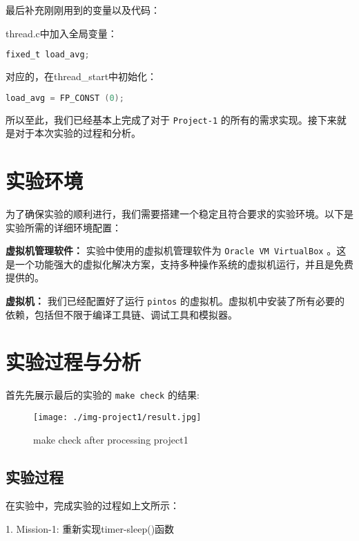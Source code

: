 \documentclass{article}
\begin{document}
	最后补充刚刚用到的变量以及代码：
	
	thread.c中加入全局变量：
	
	\begin{lstlisting}[language=C, title=thread.c加入新全局变量]
    fixed_t load_avg;
	\end{lstlisting}
	
	对应的，在thread\_start中初始化：
	
	\begin{lstlisting}[language=C, title=在thread\_start中初始化]
    load_avg = FP_CONST (0);
	\end{lstlisting}
	
	所以至此，我们已经基本上完成了对于 \texttt{Project-1} 的所有的需求实现。接下来就是对于本次实验的过程和分析。
	
	\section{实验环境}
	
	为了确保实验的顺利进行，我们需要搭建一个稳定且符合要求的实验环境。以下是实验所需的详细环境配置：
	
	\textbf{虚拟机管理软件：} 实验中使用的虚拟机管理软件为 \texttt{Oracle VM VirtualBox} 。这是一个功能强大的虚拟化解决方案，支持多种操作系统的虚拟机运行，并且是免费提供的。
	
	\textbf{虚拟机：} 我们已经配置好了运行 \texttt{pintos} 的虚拟机。虚拟机中安装了所有必要的依赖，包括但不限于编译工具链、调试工具和模拟器。
	
	\section{实验过程与分析}
	
	首先先展示最后的实验的 \texttt{make check} 的结果:
	
	\begin{figure}[htbp]
		\centering
		\texttt{[image: ./img-project1/result.jpg]}
		\caption{make check after processing project1}
		\label{fig:graph2}
	\end{figure}
	
	\subsection{实验过程}
	
	在实验中，完成实验的过程如上文所示：
	
	\setlength{\parindent}{2em}
	
	1. Mission-1: 重新实现timer-sleep()函数
	
\end{document}
